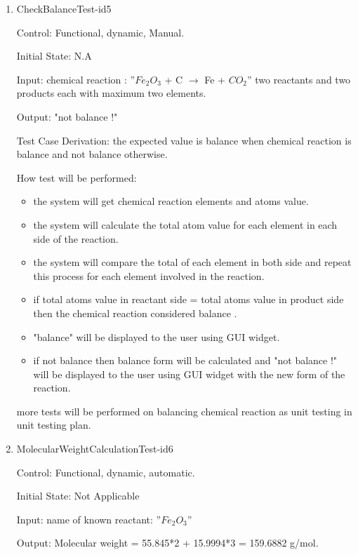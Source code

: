 \documentclass[12pt, titlepage]{article}
\begin{document}
\begin{enumerate}

\item{CheckBalanceTest-id5\\}

Control: Functional, dynamic, Manual.
					
Initial State: N.A
					
Input: 
\newline
chemical reaction : ”$Fe_2$$O_3$ + C $\rightarrow$ Fe + $CO_2$”
two reactants and two products each with maximum two elements.
	
Output: "not balance !"

Test Case Derivation: the expected value is balance when chemical reaction is balance and not balance otherwise. 

How test will be performed: 
\begin{itemize}
\item the system will get chemical reaction elements and atoms value. 
\item the system will calculate the total atom value for each element in each side of the reaction. 
\item the system will compare the total of each element in both side and repeat this process for each element involved in the reaction.
\item if total atoms value in reactant side = total atoms value in product side then the chemical reaction considered balance .
\item "balance" will be displayed to the user using GUI widget. 
\item if not balance then balance form will be calculated and "not balance !" will be displayed to the user using GUI widget with the new form of the reaction.
\end{itemize}

more tests will be performed on balancing chemical reaction as unit testing in unit testing plan. \cite{UnitVnVPlan}

\item{MolecularWeightCalculationTest-id6\\}

Control: Functional, dynamic, automatic.
					
Initial State: Not Applicable
					
Input: name of known reactant: ”$Fe_2$$O_3$”
				
Output:  Molecular weight = 55.845*2 + 15.9994*3 =  159.6882 g/mol. 


\end{enumerate}
\end{document}
